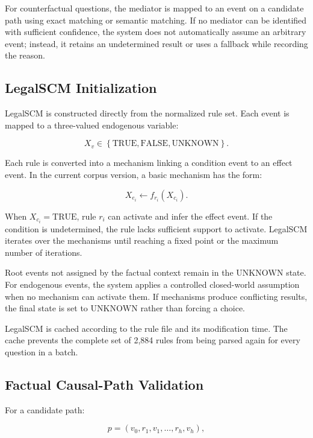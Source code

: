 For counterfactual questions, the mediator is mapped to an event on a
candidate path using exact matching or semantic matching. If no mediator can
be identified with sufficient confidence, the system does not automatically
assume an arbitrary event; instead, it retains an undetermined result or
uses a fallback while recording the reason.

\subsection{LegalSCM Initialization}

LegalSCM is constructed directly from the normalized rule set. Each event is
mapped to a three-valued endogenous variable:

\[
X_v
\in
\left\{
    \mathrm{TRUE},
    \mathrm{FALSE},
    \mathrm{UNKNOWN}
\right\}.
\]

Each rule is converted into a mechanism linking a condition event to an
effect event. In the current corpus version, a basic mechanism has the form:

\begin{equation}
X_{e_i}
\leftarrow
f_{r_i}
\left(
    X_{c_i}
\right).
\end{equation}

When \(X_{c_i}=\mathrm{TRUE}\), rule \(r_i\) can activate and infer the effect
event. If the condition is undetermined, the rule lacks sufficient support
to activate. LegalSCM iterates over the mechanisms until reaching a fixed
point or the maximum number of iterations.

Root events not assigned by the factual context remain in the
\(\mathrm{UNKNOWN}\) state. For endogenous events, the system applies a
controlled closed-world assumption when no mechanism can activate them. If
mechanisms produce conflicting results, the final state is set to
\(\mathrm{UNKNOWN}\) rather than forcing a choice.

LegalSCM is cached according to the rule file and its modification time. The
cache prevents the complete set of 2,884 rules from being parsed again for
every question in a batch.

\subsection{Factual Causal-Path Validation}

For a candidate path:

\[
p=
\left(
v_0,r_1,v_1,\ldots,r_h,v_h
\right),
\]

